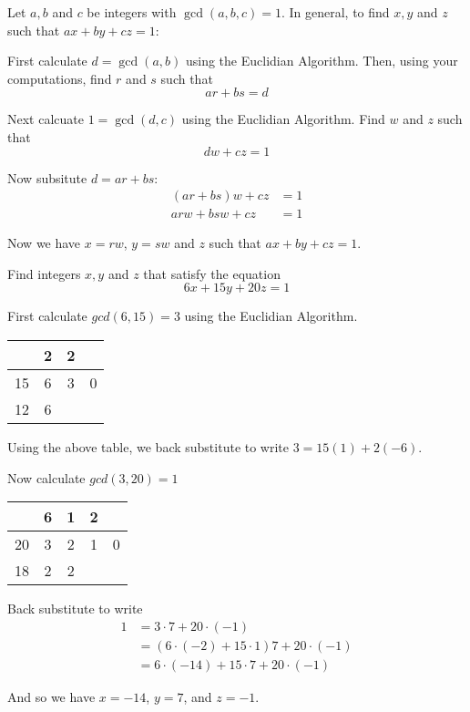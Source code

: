 Let $a, b$ and $c$ be integers with $\gcd(a,b,c) = 1$. In general, to find $x,
y$ and $z$ such that $ax + by + cz = 1$:

First calculate $d = \gcd(a,b)$ using the Euclidian Algorithm. Then, using your
computations, find $r$ and $s$ such that 
\[ ar + bs = d \]

Next calcuate $1 = \gcd(d, c)$ using the Euclidian Algorithm. Find $w$ and
$z$ such that
\[dw + cz = 1\]

Now subsitute $d = ar + bs$:
\begin{align*}
    (ar + bs)w + cz &= 1  \\
    arw + bsw + cz  &= 1
\end{align*}

Now we have $x = rw$, $y = sw$ and $z$ such that $ax + by + cz = 1$.

\begin{example}
    Find integers $x, y$ and $z$ that satisfy the equation
    \[ 6x + 15y + 20z = 1\]
    
    First calculate $gcd(6,15) = 3$ using the Euclidian Algorithm.
    \begin{table}[H]
    \centering
    \begin{tabular}{c|c|c|c}
            & 2  & 2  &    \\ \hline
        15  & 6  & 3  & 0  \\ \hline
        12  & 6  &    &
    \end{tabular}
    \end{table}

    Using the above table, we back substitute to write $3 = 15(1) + 2(-6)$.
    
    Now calculate $gcd(3,20) = 1$
    \begin{table}[H]
    \centering 
    \begin{tabular}{c|c|c|c|c}
            & 6  & 1  & 2  &    \\ \hline
        20  & 3  & 2  & 1  & 0  \\ \hline
        18  & 2  & 2  &    &
    \end{tabular}
    \end{table}
    
    Back substitute to write 
    \begin{align*}
        1 &= 3 \cdot 7 + 20 \cdot (-1) \\
          &= (6 \cdot (-2) + 15 \cdot 1)7 + 20 \cdot (-1) \\
          &= 6 \cdot (-14) + 15 \cdot 7 + 20 \cdot (-1)
    \end{align*}
    
    And so we have $x = -14$, $y = 7$, and $z=-1$.
\end{example}


